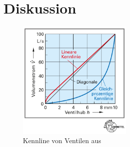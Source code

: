 \chapter{Diskussion}
\label{sec:diskussion}


\begin{figure}[h!]
	\centering
	\includegraphics[width=0.5\textwidth]{img/035-3}
	\caption{Kennline von Ventilen aus \cite{bibid}}
	\label{fig:kennlinie_ct}
\end{figure}
\FloatBarrier
